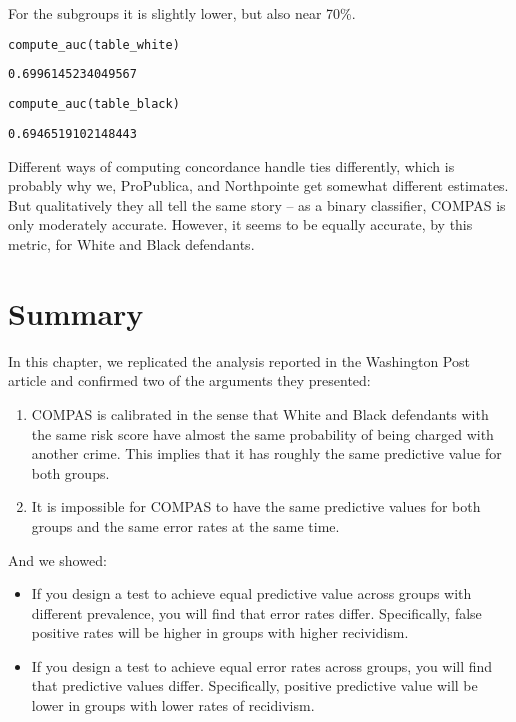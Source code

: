 For the subgroups it is slightly lower, but also near 70\%.

\begin{lstlisting}[language=Python,style=source]
compute_auc(table_white)
\end{lstlisting}

\begin{lstlisting}[style=output]
0.6996145234049567
\end{lstlisting}

\begin{lstlisting}[language=Python,style=source]
compute_auc(table_black)
\end{lstlisting}

\begin{lstlisting}[style=output]
0.6946519102148443
\end{lstlisting}

Different ways of computing concordance handle ties differently, which
is probably why we, ProPublica, and Northpointe get somewhat different
estimates. But qualitatively they all tell the same story -- as a binary
classifier, COMPAS is only moderately accurate. However, it seems to be
equally accurate, by this metric, for White and Black defendants.

\section{Summary}\label{summary}

In this chapter, we replicated the analysis reported in the Washington
Post article and confirmed two of the arguments they presented:

\begin{enumerate}
\def\labelenumi{\arabic{enumi}.}
\item
  COMPAS is calibrated in the sense that White and Black defendants with
  the same risk score have almost the same probability of being charged
  with another crime. This implies that it has roughly the same
  predictive value for both groups.
\item
  It is impossible for COMPAS to have the same predictive values for
  both groups and the same error rates at the same time.
\end{enumerate}

And we showed:

\begin{itemize}
\item
  If you design a test to achieve equal predictive value across groups
  with different prevalence, you will find that error rates differ.
  Specifically, false positive rates will be higher in groups with
  higher recividism.
\item
  If you design a test to achieve equal error rates across groups, you
  will find that predictive values differ. Specifically, positive
  predictive value will be lower in groups with lower rates of
  recidivism.
\end{itemize}

